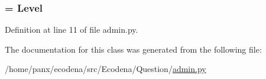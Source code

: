 \hypertarget{class_ecodena_1_1_question_1_1admin_1_1_level_inline_aeb7bcac143814e9a798564ec87de147d}{
\subsubsection[{model}]{ = Level}}
\label{d9/d52/class_ecodena_1_1_question_1_1admin_1_1_level_inline_aeb7bcac143814e9a798564ec87de147d}


Definition at line 11 of file admin.py.



The documentation for this class was generated from the following file:\begin{DoxyCompactItemize}
\item 
/home/panx/ecodena/src/Ecodena/Question/\hyperlink{_question_2admin_8py}{admin.py}\end{DoxyCompactItemize}
